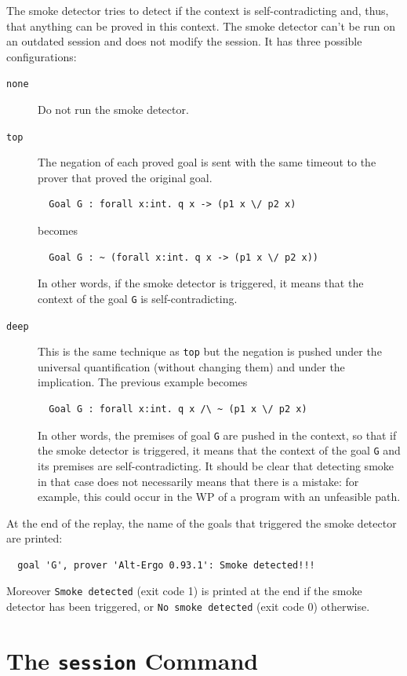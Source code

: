 The smoke detector tries to detect if the context is
self-contradicting and, thus, that anything can be proved in this
context. The smoke detector can't be run on an outdated session and does
not modify the session.  It has three possible configurations:
\begin{description}
\item[\texttt{none}] Do not run the smoke detector.
\item[\texttt{top}] The negation of each proved goal is sent with the
  same timeout to the prover that proved the original goal.
\begin{verbatim}
  Goal G : forall x:int. q x -> (p1 x \/ p2 x)
\end{verbatim}
  becomes
\begin{verbatim}
  Goal G : ~ (forall x:int. q x -> (p1 x \/ p2 x))
\end{verbatim}
  In other words, if the smoke detector is triggered, it means that the context
  of the goal \texttt{G} is self-contradicting.
\item[\texttt{deep}] This is the same technique as \texttt{top} but
  the negation is pushed under the universal quantification (without
  changing them) and under the implication. The previous example
  becomes
\begin{verbatim}
  Goal G : forall x:int. q x /\ ~ (p1 x \/ p2 x)
\end{verbatim}
  In other words, the premises of goal \texttt{G} are pushed in the
  context, so that if the smoke detector is triggered, it means that
  the context of the goal \texttt{G} and its premises are
  self-contradicting. It should be clear that detecting smoke in that
  case does not necessarily means that there is a mistake: for
  example, this could occur in the WP of a program with an unfeasible
  path.
\end{description}

At the end of the replay, the name of the goals that triggered the
smoke detector are printed:
\begin{verbatim}
  goal 'G', prover 'Alt-Ergo 0.93.1': Smoke detected!!!
\end{verbatim}
Moreover \texttt{Smoke detected} (exit code 1) is printed at the end
if the smoke detector has been triggered, or \texttt{No smoke
  detected} (exit code 0) otherwise.



\section{The \texttt{session} Command}
\label{sec:why3session}

